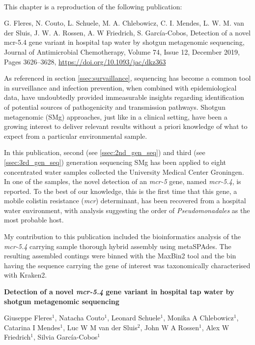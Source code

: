\mbox{}\\
\vspace{8cm}

This chapter is a reproduction of the following publication:

G. Fleres, N. Couto, L. Schuele, M. A. Chlebowicz, C. I. Mendes, L. W. M. van der Sluis, J. W. A. Rossen, A. W Friedrich, S. García-Cobos, Detection of a novel mcr-5.4 gene variant in hospital tap water by shotgun metagenomic sequencing, Journal of Antimicrobial Chemotherapy, Volume 74, Issue 12, December 2019, Pages 3626–3628, \url{https://doi.org/10.1093/jac/dkz363}

As referenced in section \ref{ssec:survaillance}, sequencing has become a common tool in surveillance and infection prevention, when combined with epidemiological data, have undoubtedly provided immeasurable insights regarding identification of potential sources of pathogenicity and transmission pathways. Shotgun metagenomic (SMg) approaches, just like in a clinical setting,  have been a growing interest to deliver relevant results without a priori knowledge of what to expect from a particular environmental sample. 

In this publication, second (see \ref{ssec:2nd_gen_seq}) and third (see \ref{ssec:3rd_gen_seq}) generation sequencing SMg has been applied to eight concentrated water samples collected the University Medical Center Groningen. In one of the samples, the novel detection of an \textit{mcr-5} gene, named \textit{mcr-5.4}, is reported. To the best of our knowledge, this is the first time that this gene, a mobile colistin resistance (\textit{mcr}) determinant, has been recovered from a hospital water environment, with analysis suggesting the order of \textit{Pseudomonadales} as the most probable host. 

My contribution to this publication included the bioinformatics analysis of the \textit{mcr-5.4} carrying sample thorough hybrid assembly using metaSPAdes. The resulting assembled contings were binned with the MaxBin2 tool and the bin having the sequence carrying the gene of interest was taxonomically characterised with Kraken2.


\cleardoublepage 

\begin{center}
\large
\textbf{Detection of a novel \textit{mcr-5.4} gene
variant in hospital tap water by
shotgun metagenomic sequencing}
\end{center}

Giuseppe Fleres$^1$, 
Natacha Couto$^1$, 
Leonard Schuele$^1$,
Monika A Chlebowicz$^1$,
Catarina I Mendes$^1$,
Luc W M van der Sluis$^2$, 
John W A Rossen$^1$, 
Alex W Friedrich$^1$, 
Silvia García-Cobos$^1$

